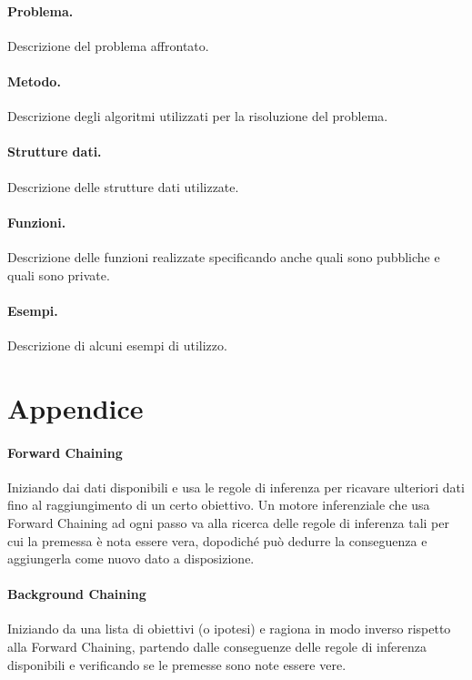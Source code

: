 \documentclass[12pt,twoside]{report}
\begin{document}
\paragraph{Problema.} Descrizione del problema affrontato.

\paragraph{Metodo.} Descrizione degli algoritmi utilizzati per la risoluzione del problema.

\paragraph{Strutture dati.} Descrizione delle strutture dati utilizzate. 

\paragraph{Funzioni.} Descrizione delle funzioni realizzate specificando anche quali sono pubbliche e quali sono private.

\paragraph{Esempi.} Descrizione di alcuni esempi di utilizzo.

\cleardoublepage


\section*{Appendice}
\paragraph{Forward Chaining} Iniziando dai dati disponibili e usa le regole di inferenza per ricavare ulteriori dati fino al raggiungimento di un certo obiettivo. Un motore inferenziale che usa Forward Chaining ad ogni passo va alla ricerca delle regole di inferenza tali per cui la premessa è nota essere vera, dopodiché può dedurre la conseguenza e aggiungerla come nuovo dato a disposizione.
\paragraph{Background Chaining} Iniziando da una lista di obiettivi (o ipotesi) e ragiona in modo inverso rispetto alla Forward Chaining, partendo dalle conseguenze delle regole di inferenza disponibili e verificando se le premesse sono note essere vere.
\end{document}
